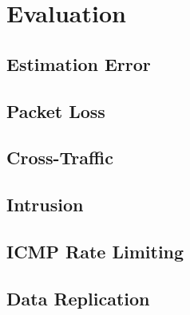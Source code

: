 \chapter{Evaluation}

\section{Estimation Error}

\section{Packet Loss}

\section{Cross-Traffic}

\section{Intrusion}

\section{ICMP Rate Limiting}

\section{Data Replication}



